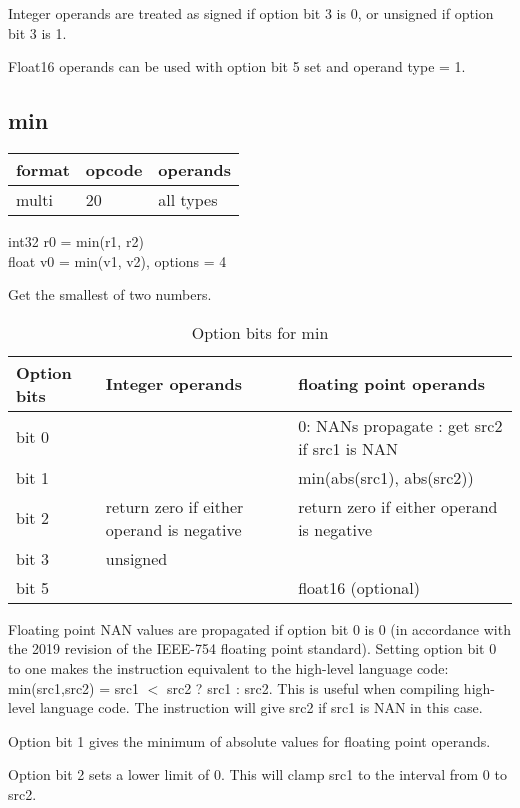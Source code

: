 \documentclass[forwardcom.tex]{subfiles}
\begin{document}
Integer operands are treated as signed if option bit 3 is 0, or unsigned if option bit 3 is 1.
\vv

Float16 operands can be used with option bit 5 set and operand type = 1.
\vv


\subsection{min}
\label{table:minInstruction}
\begin{tabular}{|p{12mm}|p{15mm}|p{100mm}|}
\hline
\bfseries format & \bfseries opcode & \bfseries operands \\ \hline
multi & 20 & all types \\ \hline
\end{tabular}
\vv

int32 r0 = min(r1, r2) \\
float v0 = min(v1, v2), options = 4
\vv

Get the smallest of two numbers.
\vv

\begin{longtable} {|p{16mm}|p{50mm}|p{50mm}|}
\caption{Option bits for min} 
\endfirsthead
\endhead
\hline
\bfseries Option bits & \bfseries Integer operands & \bfseries floating point operands   \\
\hline
bit 0 &  & 0: NANs propagate \newline 1: get src2 if src1 is NAN \\
\hline
bit 1 &  & min(abs(src1), abs(src2)) \\
\hline
bit 2 & return zero if either operand is negative & return zero if either operand is negative \\
\hline
bit 3 & unsigned & \\
\hline
bit 5 &  & float16 (optional) \\
\hline
\end{longtable}


Floating point NAN values are propagated if option bit 0 is 0 (in accordance with the 2019 revision of the IEEE-754 floating point standard). 
Setting option bit 0 to one makes the instruction equivalent to the high-level language code:  min(src1,src2) = src1 $<${} src2 ? src1 : src2. This is useful when compiling high-level language code. The instruction will give src2 if src1 is NAN in this case.
\vv

Option bit 1 gives the minimum of absolute values for floating point operands.
\vv

Option bit 2 sets a lower limit of 0. This will clamp src1 to the interval from 0 to src2.
\vv
\end{document}
